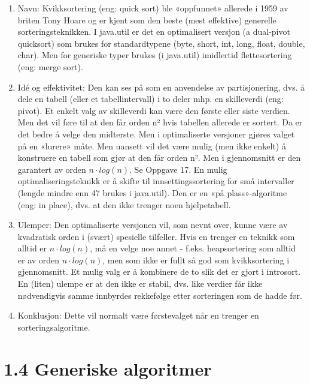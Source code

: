 \documentclass[11pt]{article}
\begin{document}
            \begin{enumerate}
                \item Navn: Kvikksortering (eng: quick sort)
                    ble «oppfunnet» allerede i 1959 av briten Tony Hoare
                    og er kjent som den beste (mest effektive) generelle sorteringsteknikken.
                    I java.util er det en optimalisert versjon (a dual-pivot quicksort) som brukes for standardtypene (byte, short, int, long, float, double, char).
                    Men for generiske typer brukes (i java.util) imidlertid flettesortering (eng: merge sort).
                \item Idé og effektivitet: Den kan ses på som en anvendelse av partisjonering, dvs. å dele en tabell (eller et tabellintervall) i to deler mhp. en skilleverdi (eng: pivot).
                    Et enkelt valg av skilleverdi kan være den første eller siste verdien. Men det vil føre til at den får orden n² hvis tabellen allerede er sortert. Da er det bedre å velge den midterste. Men i optimaliserte versjoner gjøres valget på en «lurere» måte.
                    Men uansett vil det være mulig (men ikke enkelt) å konstruere en tabell som gjør at den får orden n². Men i gjennomsnitt er den garantert av orden $n\cdot log(n)$. Se Oppgave 17. En mulig optimaliseringsteknikk er å skifte til innsettingssortering for små intervaller (lengde mindre enn 47 brukes i java.util). Den er en «på plass»-algoritme (eng: in place), dvs. at den ikke trenger noen hjelpetabell.
                \item Ulemper: Den optimaliserte versjonen vil, som nevnt over, kunne være av kvadratisk orden i (svært) spesielle tilfeller. Hvis en trenger en teknikk som alltid er $n\cdot log(n)$, må en velge noe annet - f.eks. heapsortering som alltid er av orden $n\cdot log(n)$, men som ikke er fullt så god som kvikksortering i gjennomsnitt. Et mulig valg er å kombinere de to slik det er gjort i introsort. En (liten) ulempe er at den ikke er stabil, dvs. like verdier får ikke nødvendigvis samme innbyrdes rekkefølge etter sorteringen som de hadde før.
                \item Konklusjon: Dette vil normalt være førstevalget når en trenger en sorteringsalgoritme.
            \end{enumerate}
\newpage

\section{1.4 Generiske algoritmer}
\end{document}
